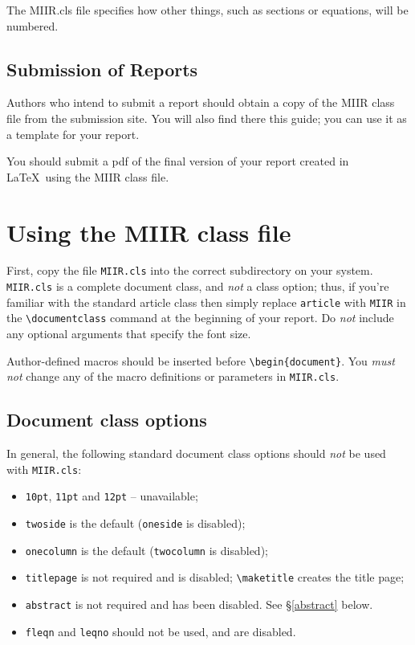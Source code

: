 \documentclass{MIIR}
\theoremstyle{plain}
\theoremstyle{definition}
\begin{document}
The MIIR.cls file specifies how other things, such as sections or equations, will be numbered. 




\subsection{Submission of Reports}

Authors who intend to submit a report should obtain a copy of the
MIIR class file from the submission site.
You will also find there this guide; you can use it as a template for your report.

You should submit a pdf of the final version of your report created in \LaTeX\ using the MIIR class file.



\section{Using the MIIR class file}

First, copy the file \verb"MIIR.cls"  into the correct subdirectory on your system.
\verb"MIIR.cls"  is a complete document class, and
\emph{not} a class option; thus,
if you're familiar with the standard article class then simply replace \verb"article"  with \verb"MIIR" in the
\verb"\documentclass" command at the beginning of your report. Do \emph{not} include any optional arguments that specify the font size.


Author-defined macros should be inserted before \verb"\begin{document}".
You\emph{ must not} change any of the macro definitions
or parameters in \verb"MIIR.cls".

\subsection{Document class options}\label{sec:ClassOp}

In general, the following standard document class options should \emph{not} be
used with \verb"MIIR.cls":
%
\begin{itemize}
  \item \texttt{10pt}, \texttt{11pt} and \texttt{12pt} -- unavailable;
  \item \texttt{twoside} is the default (\texttt{oneside} is disabled);
  \item \texttt{onecolumn} is the default (\texttt{twocolumn} is disabled);
  \item \texttt{titlepage} is not required and is disabled; \verb"\maketitle" creates the title page;
  \item \texttt{abstract} is not required and has been disabled. See \S\ref{abstract} below.
  \item \texttt{fleqn} and \texttt{leqno} should not be used, and are disabled.
\end{itemize}
\end{document}
